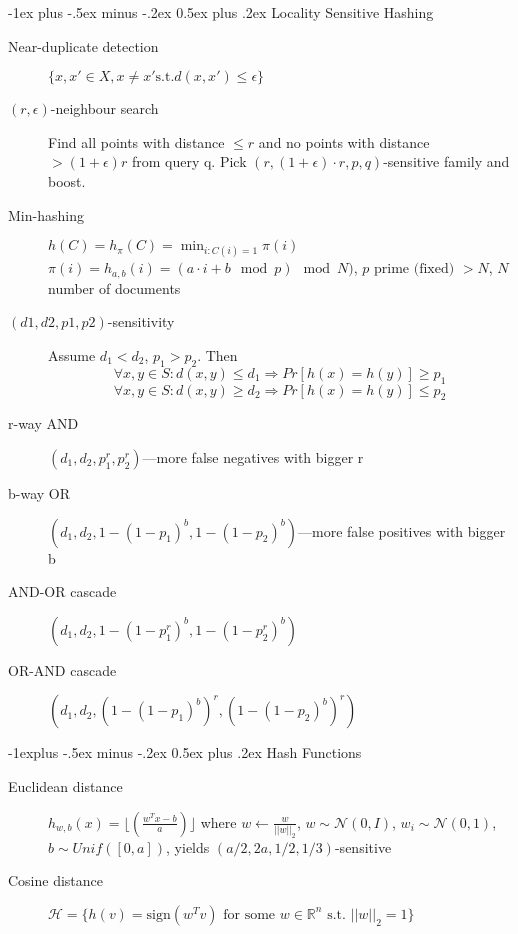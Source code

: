 \documentclass[11pt,landscape]{article}
\makeatletter
\renewcommand{\section}{\@startsection{section}{1}{0mm}%
                                {-1ex plus -.5ex minus -.2ex}%
                                {0.5ex plus .2ex}%
                                {\normalfont\normalsize\bfseries}}
\renewcommand{\subsection}{\@startsection{subsection}{2}{0mm}%
                                {-1explus -.5ex minus -.2ex}%
                                {0.5ex plus .2ex}%
                                {\normalfont\normalsize\bfseries}}
\makeatother
\begin{document}
\begin{multicols}{3}
\section{Locality Sensitive Hashing}
	\begin{description}
		\item[Near-duplicate detection] $ \{x,x' \in X, x \neq x' \text{s.t.} d(x,x') \leq \epsilon \}$
		\item[$(r,\epsilon)$-neighbour search] 
		Find all points with distance $\leq r$ and no points with distance $> (1+ \epsilon)r$ from query q.
		Pick $(r,(1+\epsilon) \cdot r,p,q)$-sensitive family and boost.
	    \item[Min-hashing] $h(C) = h_{\pi}(C) = \min_{i : C(i) = 1} \pi(i)$
	    \subitem $\pi(i) = h_{a, b}(i) = (a \cdot i + b \mod p) \mod N)$,
	    $p \text{ prime (fixed) } > N$, $N$ number of documents
        \item[$(d1,d2,p1,p2)$-sensitivity] Assume $d_1 < d_2$, $p_1 > p_2$. Then
        $$\forall x,y \in S: d(x,y) \leq d_1 \Rightarrow Pr[h(x)=h(y)] \geq p_1$$
        $$\forall x,y \in S: d(x,y) \geq d_2 \Rightarrow Pr[h(x)=h(y)] \leq p_2$$
        \item[r-way AND] $(d_1,d_2,p_1^r,p_2^r)$---more false negatives with bigger r
        \item[b-way OR] $(d_1,d_2,1-(1-p_1)^b,1-(1-p_2)^b)$---more false positives with bigger b
        \item[AND-OR cascade] $(d_1,d_2,1-(1-p_1^r)^b,1-(1-p_2^r)^b)$
        \item[OR-AND cascade] $(d_1,d_2,(1-(1-p_1)^b)^r,(1-(1-p_2)^b)^r)$
	\end{description}
\subsection{Hash Functions}
\begin{description}
    \item[Euclidean distance] $h_{w,b}(x) =  \lfloor (\frac{w^Tx-b}{a}) \rfloor$
where $w \leftarrow \frac{w}{||w||_2}$, $w \sim \mathcal{N}(0,I)$, $w_i \sim \mathcal{N}(0,1)$, $b \sim Unif([0,a])$, yields $(a/2,2a,1/2,1/3)$-sensitive
    \item[Cosine distance] $\mathcal{H} = \{ h(v) = \text{sign}(w^Tv) \text{ for some } w \in \mathbb{R}^n \text{ s.t. } ||w||_2 = 1 \}$
\end{description}


\end{multicols}
\end{document}
